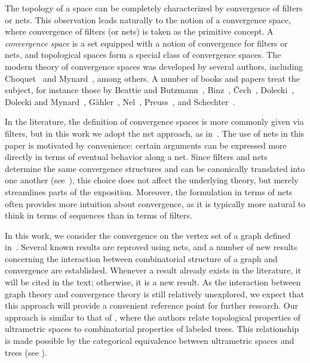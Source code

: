 \documentclass{amsart}
\theoremstyle{definition}
\theoremstyle{remark}
\numberwithin{equation}{section}
\begin{document}
 The topology of a space can be completely characterized
by convergence of filters or nets. This observation
leads naturally to the notion of a convergence space, where convergence
of filters (or nets) is taken as the primitive concept.
A \emph{convergence space} is a set equipped with a notion of convergence
for filters or nets, and topological spaces form a special class of
convergence spaces. The modern theory of convergence spaces was
developed by several authors, including Choquet~\cite{Choquet} and
Mynard~\cite{Mynard_convergencia}, among others. A number of books and papers treat the subject,
for instance those by Beattie and Butzmann~\cite{BB}, Binz~\cite{binz},
\v{C}ech~\cite{Cech1966}, Dolecki~\cite{dol}, Dolecki and Mynard~\cite{DM},
Gähler~\cite{gahler}, Nel~\cite{nel}, Preuss~\cite{preuss}, and
Schechter~\cite{schechter}.

In the literature, the definition of convergence spaces is more commonly given via filters, but in this work we adopt the net approach, as in~\cite{nettopology, unknown}. The use of nets in this paper is motivated by convenience: certain arguments can be expressed more directly in terms of eventual behavior along a net. Since filters and nets determine the same convergence structures and can be canonically translated into one another (see~\cite{preuss}), this choice does not affect the underlying theory, but merely streamlines parts of the exposition. Moreover, the formulation in terms of nets often provides more intuition about convergence, as it is typically more natural to think in terms of sequences than in terms of filters.



In this work, we consider the convergence on the vertex set of a graph defined in~\cite{mynardconnec,probconv}. 
Several known results are reproved using nets, and a number of new results concerning the interaction between combinatorial structure of a graph and convergence are established. Whenever a result already exists in the literature, it will be cited in the text; otherwise, it is a new result.  As the interaction between graph theory and convergence theory is still relatively unexplored, we expect that this approach will provide a convenient reference point for further research. Our approach is similar to that of \cite{DovgosheyRovenska2026}, where the authors relate topological properties of ultrametric spaces to combinatorial properties of labeled trees. This relationship is made possible by the categorical equivalence between ultrametric spaces and trees (see \cite{Hughes2004}).
\end{document}
